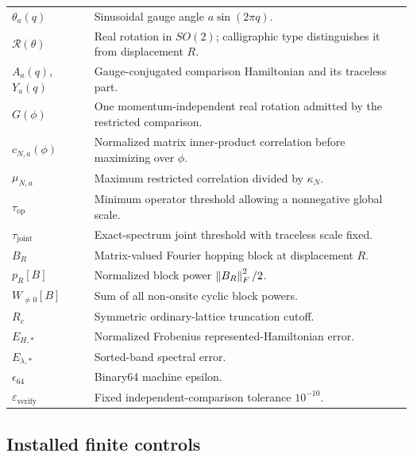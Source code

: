 \begin{longtable}{@{}p{}p{}@{}}
$\theta_a(q)$ & Sinusoidal gauge angle $a\sin(2\pi q)$.\\
$\mathcal R(\theta)$ & Real rotation in $SO(2)$; calligraphic type distinguishes it from displacement $R$.\\
$A_a(q)$, $Y_a(q)$ & Gauge-conjugated comparison Hamiltonian and its traceless part.\\
$G(\phi)$ & One momentum-independent real rotation admitted by the restricted comparison.\\
$c_{N,a}(\phi)$ & Normalized matrix inner-product correlation before maximizing over $\phi$.\\
$\mu_{N,a}$ & Maximum restricted correlation divided by $\kappa_N$.\\
$\tau_{\mathrm{op}}$ & Minimum operator threshold allowing a nonnegative global scale.\\
$\tau_{\mathrm{joint}}$ & Exact-spectrum joint threshold with traceless scale fixed.\\
$B_R$ & Matrix-valued Fourier hopping block at displacement $R$.\\
$p_R[B]$ & Normalized block power $\left\lVert B_R\right\rVert_F^2/2$.\\
$W_{\ne0}[B]$ & Sum of all non-onsite cyclic block powers.\\
$R_c$ & Symmetric ordinary-lattice truncation cutoff.\\
$E_{H,*}$ & Normalized Frobenius represented-Hamiltonian error.\\
$E_{\lambda,*}$ & Sorted-band spectral error.\\
$\epsilon_{64}$ & Binary64 machine epsilon.\\
$\varepsilon_{\mathrm{verify}}$ & Fixed independent-comparison tolerance $10^{-10}$.\\
\bottomrule
\end{longtable}

\subsection{Installed finite controls}

